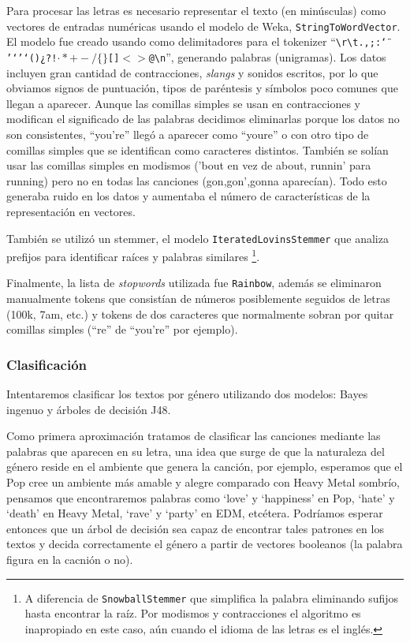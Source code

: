\documentclass[spanish,11pt,letterpaper]{article}
\begin{document}
Para procesar las letras
es necesario representar el texto (en minúsculas) como vectores de entradas numéricas usando
el modelo de Weka, \texttt{StringToWordVector}. El modelo fue creado usando como
delimitadores para el tokenizer
``\texttt{\textvisiblespace\textbackslash r\textbackslash t.,;:\char`\"}%
\texttt{'‘’`()¿?!$\cdot*+-/\{\}$[]$<>$@\textbackslash n}'', generando palabras (unigramas).
Los datos incluyen gran cantidad de contracciones, \textit{slangs} y sonidos escritos, por
lo que obviamos signos de puntuación, tipos de paréntesis y símbolos poco comunes
que llegan a aparecer. Aunque las comillas simples se usan en contracciones y
modifican el significado de las palabras decidimos eliminarlas porque los datos
no son consistentes, ``you're'' llegó a aparecer como ``you\textvisiblespace re''
o con otro tipo de comillas simples que se identifican como caracteres distintos.
También se solían usar las comillas simples en modismos ('bout
en vez de about, runnin' para running) pero no en todas las canciones (gon,gon',gonna
aparecían). Todo esto generaba ruido en los datos y aumentaba el número de
características de la representación en vectores.

También se utilizó un stemmer, el modelo \texttt{IteratedLovinsStemmer} que analiza
prefijos para identificar raíces y palabras similares%
\footnote{A diferencia de \texttt{SnowballStemmer} que simplifica
la palabra eliminando sufijos hasta encontrar la raíz. Por modismos
y contracciones el algoritmo es inapropiado en este caso, aún cuando el idioma
de las letras es el inglés.}.

Finalmente, la lista de \textit{stopwords} utilizada fue \texttt{Rainbow}, además
se eliminaron manualmente tokens que consistían de números posiblemente seguidos de letras
(100k, 7am, etc.) y tokens de dos caracteres que normalmente sobran por quitar
comillas simples (``re'' de ``you're'' por ejemplo).

\subsubsection{Clasificación}

Intentaremos clasificar los textos por género utilizando dos modelos: Bayes ingenuo
y árboles de decisión J48.

Como primera aproximación tratamos de clasificar las canciones mediante las
palabras que aparecen en su letra, una idea que surge de que la
naturaleza del género reside en el ambiente que genera la canción, por ejemplo,
esperamos que el Pop cree un ambiente más amable y alegre comparado con Heavy
Metal sombrío, pensamos que encontraremos palabras como `love' y `happiness' en Pop,
`hate' y `death' en Heavy Metal, `rave' y `party' en EDM, etcétera. Podríamos esperar
entonces que un árbol de decisión sea capaz de encontrar tales patrones en los
textos y decida correctamente el género a partir de vectores booleanos (la
palabra figura en la cacnión o no).
\end{document}
